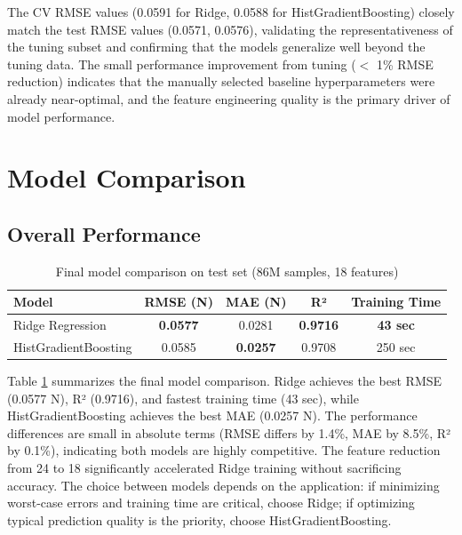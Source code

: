 \documentclass[12pt,a4paper]{article}
\begin{document}
The CV RMSE values (0.0591 for Ridge, 0.0588 for HistGradientBoosting) closely match the test RMSE values (0.0571, 0.0576), validating the representativeness of the tuning subset and confirming that the models generalize well beyond the tuning data. The small performance improvement from tuning ($<$ 1\% RMSE reduction) indicates that the manually selected baseline hyperparameters were already near-optimal, and the feature engineering quality is the primary driver of model performance.


\newpage
\section{Model Comparison}

\subsection{Overall Performance}

\begin{table}[H]
\centering
\caption{Final model comparison on test set (86M samples, 18 features)}
\label{tab:comparison}
\begin{tabular}{lcccc}
\toprule
\textbf{Model} & \textbf{RMSE (N)} & \textbf{MAE (N)} & \textbf{R²} & \textbf{Training Time} \\
\midrule
Ridge Regression & \textbf{0.0577} & 0.0281 & \textbf{0.9716} & \textbf{43 sec} \\
HistGradientBoosting & 0.0585 & \textbf{0.0257} & 0.9708 & 250 sec \\
\bottomrule
\end{tabular}
\end{table}

Table \ref{tab:comparison} summarizes the final model comparison. Ridge achieves the best RMSE (0.0577 N), R² (0.9716), and fastest training time (43 sec), while HistGradientBoosting achieves the best MAE (0.0257 N). The performance differences are small in absolute terms (RMSE differs by 1.4\%, MAE by 8.5\%, R² by 0.1\%), indicating both models are highly competitive. The feature reduction from 24 to 18 significantly accelerated Ridge training without sacrificing accuracy. The choice between models depends on the application: if minimizing worst-case errors and training time are critical, choose Ridge; if optimizing typical prediction quality is the priority, choose HistGradientBoosting.
\end{document}
